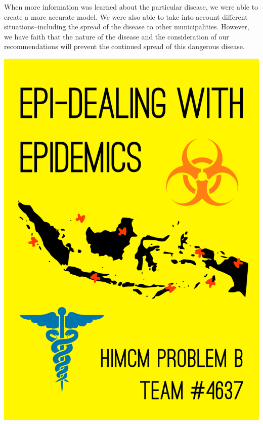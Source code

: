 \documentclass[12pt]{article}
\begin{document}
When more information was learned about the particular disease, we were able to create a more accurate model. We were also able to take into account different situations--including the spread of the disease to other municipalities. However, we have faith that the nature of the disease and the consideration of our recommendations will prevent the continued spread of this dangerous disease.

\newpage
\begin{center}
\includegraphics[width=\textwidth]{himcmcover}
\end{center}

\tableofcontents

\newpage
\end{document}
